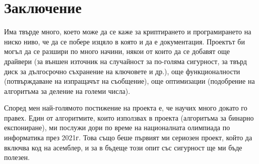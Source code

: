 \chapter*{Заключение}
Има твърде много, което може да се каже за криптирането и програмирането на ниско ниво, че да се побере изцяло в която и да е документация. Проектът би могъл да се разшири по много начини, някои от които да се добавят още драйвери (за външен източник на случайност за по-голяма сигурност, за твърд диск за дългосрочно съхранение на ключовете и др.), още функционалности (потвърждаване на изпращачът на съобщение), още оптимизации (подобрение на алгоритъма за деление на големи числа).

Според мен най-голямото постижение на проекта е, че научих много докато го правех. Един от алгоритмите, които използвах в проекта (алгоритъма за бинарно експониране), ми послужи дори по време на националната олимпиада по информатика през 2021г. Това също беше първият ми сериозен проект, който да включва код на асемблер, и за в бъдеще този опит със сигурност ще ми бъде полезен.


